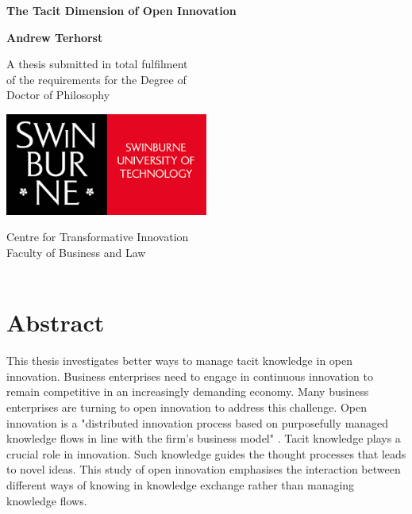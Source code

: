 \documentclass[12pt,table]{book}
\renewcommand{\today}{\the\day \ \monthname \ \the\year}
\begin{document}
\frontmatter

\begin{titlepage}
\renewcommand{\today}{\monthname \ \the\year}
\begin{center}
\vspace*{1cm}

\Huge
\textbf{The Tacit Dimension of Open Innovation}\\
\vspace{1cm}

\Large
\textbf{Andrew Terhorst}
\vfill

\Large
A thesis submitted in total fulfilment\\
of the requirements for the Degree of \\
Doctor of Philosophy

\vspace{1cm}

\includegraphics[width=0.5\textwidth]{Images/swinburne_university_of_technology.png} 

\vspace{1cm}

\Large
Centre for Transformative Innovation\\
Faculty of Business and Law\\
\today
\end{center}
\end{titlepage}

\doublespacing

\chapter*{Abstract}

This thesis investigates better ways to manage tacit knowledge in open innovation. Business enterprises need to engage in continuous innovation to remain competitive in an increasingly demanding economy. Many business enterprises are turning to open innovation to address this challenge. Open innovation is a "distributed innovation process based on purposefully managed knowledge flows in line with the firm's business model" \citep{chesbrough2014explicating}. Tacit knowledge plays a crucial role in innovation. Such knowledge guides the thought processes that leads to novel ideas. This study of open innovation emphasises the interaction between different ways of knowing in knowledge exchange rather than managing knowledge flows. \medskip
\end{document}
